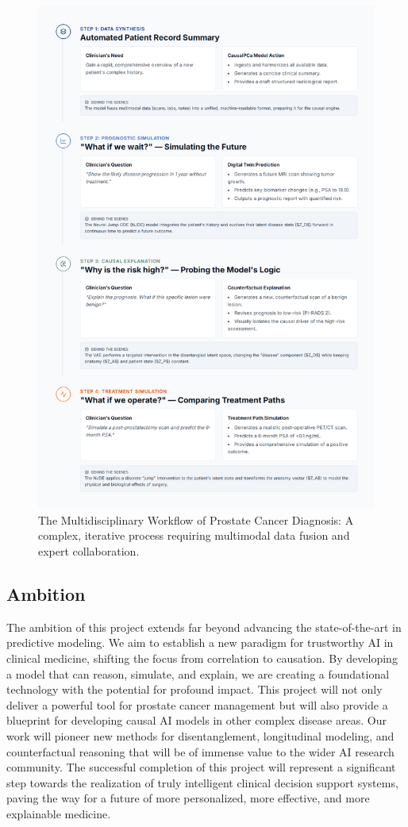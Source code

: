\documentclass[11pt, a4paper]{article}
\begin{document}
\begin{figure}[H]
    \centering
    \includegraphics[width=\textwidth]{wf.png}
    \caption{The Multidisciplinary Workflow of Prostate Cancer Diagnosis: A complex, iterative process requiring multimodal data fusion and expert collaboration.}
    \label{fig:workflow}
\end{figure}

\subsection{Ambition}
The ambition of this project extends far beyond advancing the state-of-the-art in predictive modeling. We aim to establish a new paradigm for trustworthy AI in clinical medicine, shifting the focus from correlation to causation. By developing a model that can reason, simulate, and explain, we are creating a foundational technology with the potential for profound impact. This project will not only deliver a powerful tool for prostate cancer management but will also provide a blueprint for developing causal AI models in other complex disease areas. Our work will pioneer new methods for disentanglement, longitudinal modeling, and counterfactual reasoning that will be of immense value to the wider AI research community. The successful completion of this project will represent a significant step towards the realization of truly intelligent clinical decision support systems, paving the way for a future of more personalized, more effective, and more explainable medicine.
\end{document}
